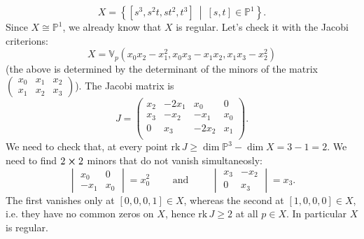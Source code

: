 \begin{ex}
	\begin{equation}
		X = \left\{ [s^3, s^2t, st^2, t^3] \ \middle|\ [s,t] \in \mathbb{P}^{1} \right\}
	.\end{equation} 
	Since $X \cong \mathbb{P}^{1}$, we already know that $X$ is regular.
	Let's check it with the Jacobi criterions:
	\begin{equation}
	X = \mathbb{V}_p\left( x_0x_2 - x_1^2, x_0x_3 - x_1x_2, x_1x_3 - x_2^2 \right)
	\end{equation} 
	(the above is determined by the determinant of the minors of the matrix 
	$\begin{pmatrix} x_0 & x_1 & x_2\\ x_1 & x_2 & x_3 \end{pmatrix}$).
	The Jacobi matrix is
	\begin{equation}
	J = 
	\begin{pmatrix}
		x_2 & -2 x_1 & x_0 & 0\\
		x_3 & -x_2 & -x_1 & x_0\\
		0 & x_3 & -2 x_2 & x_1\\
	\end{pmatrix} 
	.\end{equation} 
	We need to check that, at every point $\mathrm{rk}\, J \geq \dim \mathbb{P}^{3} - \dim X = 3 - 1 = 2$.
	We need to find $2 \cross 2$ minors that do not vanish simultaneosly:
	\begin{equation}
	\begin{vmatrix}
		x_0 & 0\\
		-x_1 & x_0
	\end{vmatrix} = x_0^2
	\qquad \text{ and } \qquad
	\begin{vmatrix}
		x_3 & -x_2 \\
		0 & x_3
	\end{vmatrix} = x_3
	.\end{equation} 
	The first vanishes only at $[0,0,0,1] \in X$, whereas the second at $[1,0,0,0] \in X$, 
	i.e. they have no common zeros on $X$, hence $\mathrm{rk}\, J \geq 2$ at all $p \in X$.
	In particular $X$ is regular.
\end{ex} 	
